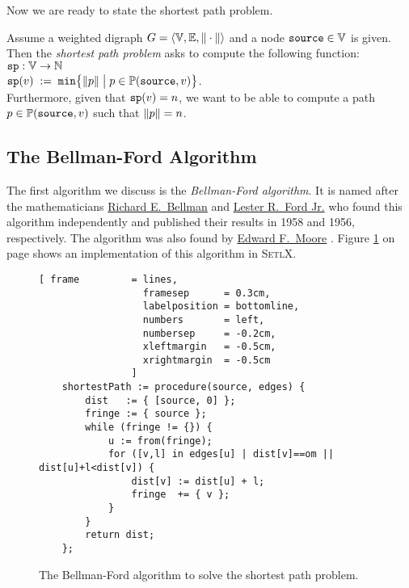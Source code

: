 Now we are ready to state the shortest path problem.

\begin{Definition} \lb
  Assume a weighted digraph  
  $G = \langle {\mathbb V}, {\mathbb E}, \|\cdot\| \rangle$ 
  and a node $\mbox{\tt source} \in {\mathbb V}$ is given.  Then the \emph{shortest path problem} asks to compute
  the following function:
  \\[0.2cm]
  \hspace*{1.3cm} $\mbox{\tt sp}: {\mathbb V} \rightarrow {\mathbb N}$ \\[0.1cm]
  \hspace*{1.3cm} $\mbox{\tt sp}(v) \;:=\; \mathtt{min}\bigl\{ \|p\| \bigm| p \in {\mathbb P}(\mbox{\tt source},v) \bigr\}$.
  \\[0.2cm]
  Furthermore, given that $\mbox{\tt sp}(v) = n$, we want to be able to compute a path 
  $p \in {\mathbb P}(\mbox{\tt source},v)$ such that $\|p\| = n$.
  \eox
\end{Definition}

\subsection{The Bellman-Ford Algorithm}
The first algorithm we discuss is the \emph{Bellman-Ford algorithm}.  It is named after the mathematicians
\href{https://en.wikipedia.org/wiki/Richard_E._Bellman}{Richard E.~Bellman} \cite{bellman:58} and 
\href{https://en.wikipedia.org/wiki/L._R._Ford_Jr.}{Lester R.~Ford Jr.} \cite{ford:56} who found this algorithm
independently and published their results in 1958 and 1956, respectively.  The algorithm was also
found by \href{https://en.wikipedia.org/wiki/Edward_F._Moore}{Edward F.~Moore} \cite{moore:59}.
Figure \ref{fig:moore.stlx} on page \pageref{fig:moore.stlx} shows an implementation of this
algorithm in \textsc{SetlX}.

\begin{figure}[!ht]
  \centering
\begin{Verbatim}[ frame         = lines, 
                  framesep      = 0.3cm, 
                  labelposition = bottomline,
                  numbers       = left,
                  numbersep     = -0.2cm,
                  xleftmargin   = -0.5cm,
                  xrightmargin  = -0.5cm
                ]
    shortestPath := procedure(source, edges) {
        dist   := { [source, 0] };
        fringe := { source };
        while (fringe != {}) {
            u := from(fringe);
            for ([v,l] in edges[u] | dist[v]==om || dist[u]+l<dist[v]) {
                dist[v] := dist[u] + l;
                fringe  += { v };
            }
        }
        return dist;
    };
\end{Verbatim}
\vspace*{-0.3cm}
  \caption{The Bellman-Ford algorithm to solve the shortest path problem.}
  \label{fig:moore.stlx}
\end{figure} 

